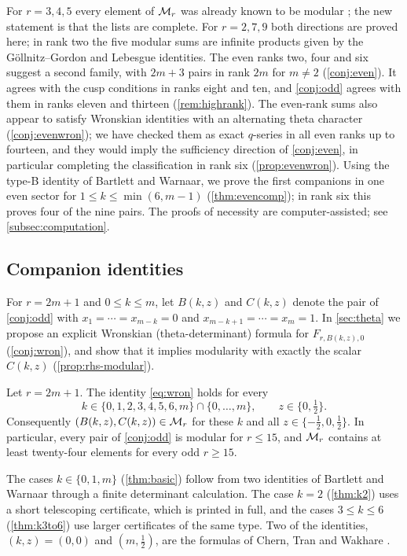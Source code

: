 For $r=3,4,5$ every element of $\mathcal{M}_r$ was already known to be modular \cite{MW24,SW26,SW26b}; the new statement is that the lists are complete. For $r=2,7,9$ both directions are proved here; in rank two the five modular sums are infinite products given by the Göllnitz--Gordon and Lebesgue identities. The even ranks two, four and six suggest a second family, with $2m+3$ pairs in rank $2m$ for $m\ne2$ (\cref{conj:even}). It agrees with the cusp conditions in ranks eight and ten, and \cref{conj:odd} agrees with them in ranks eleven and thirteen (\cref{rem:highrank}). The even-rank sums also appear to satisfy Wronskian identities with an alternating theta character (\cref{conj:evenwron}); we have checked them as exact $q$-series in all even ranks up to fourteen, and they would imply the sufficiency direction of \cref{conj:even}, in particular completing the classification in rank six (\cref{prop:evenwron}). Using the type-B identity of Bartlett and Warnaar, we prove the first companions in one even sector for $1\le k\le\min(6,m-1)$ (\cref{thm:evencomp}); in rank six this proves four of the nine pairs. The proofs of necessity are computer-assisted; see \cref{subsec:computation}.

\subsection{Companion identities}
For $r=2m+1$ and $0\le k\le m$, let $B(k,z)$ and $C(k,z)$ denote the pair of \cref{conj:odd} with $x_1=\cdots=x_{m-k}=0$ and $x_{m-k+1}=\cdots=x_m=1$. In \cref{sec:theta} we propose an explicit Wronskian (theta-determinant) formula for $F_{r,B(k,z),0}$ (\cref{conj:wron}), and show that it implies modularity with exactly the scalar $C(k,z)$ (\cref{prop:rhs-modular}).

\begin{theorem}\label{thm:main-comp}
Let $r=2m+1$. The identity \eqref{eq:wron} holds for every
\[
k\in\{0,1,2,3,4,5,6,m\}\cap\{0,\dots,m\},\qquad z\in\{0,\tfrac12\}.
\]
Consequently $(B(k,z),C(k,z))\in\mathcal{M}_r$ for these $k$ and all $z\in\{-\frac12,0,\frac12\}$. In particular, every pair of \cref{conj:odd} is modular for $r\le15$, and $\mathcal{M}_r$ contains at least twenty-four elements for every odd $r\ge15$.
\end{theorem}

The cases $k\in\{0,1,m\}$ (\cref{thm:basic}) follow from two identities of Bartlett and Warnaar \cite{BW15} through a finite determinant calculation. The case $k=2$ (\cref{thm:k2}) uses a short telescoping certificate, which is printed in full, and the cases $3\le k\le6$ (\cref{thm:k3to6}) use larger certificates of the same type. Two of the identities, $(k,z)=(0,0)$ and $(m,\tfrac12)$, are the formulas of Chern, Tran and Wakhare \cite[Theorem~1.4]{CTW26}.

